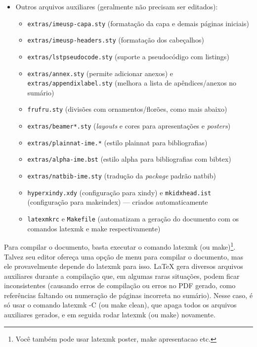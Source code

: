 \begin{itemize}
  \item Outros arquivos auxiliares (geralmente não precisam ser editados):
  \begin{itemize}
    \item \texttt{extras/imeusp-capa.sty} (formatação da capa e demais páginas iniciais)
    \item \texttt{extras/imeusp-headers.sty} (formatação dos cabeçalhos)
    \item \texttt{extras/lstpseudocode.sty} (suporte a pseudocódigo com \textsf{listings})
    \item \texttt{extras/annex.sty} (permite adicionar anexos) e
          \texttt{extras/appendixlabel.sty} (melhora a lista de
          apêndices/anexos no sumário)
    \item \texttt{frufru.sty} (divisões com ornamentos/florões, como mais abaixo)
    \item \texttt{extras/beamer*.sty} (\textit{layouts} e cores para
          apresentações e \textit{posters})
    \item \texttt{extras/plainnat-ime.*} (estilo plainnat para bibliografias)
    \item \texttt{extras/alpha-ime.bst} (estilo alpha para bibliografias com
          bibtex)
    \item \texttt{extras/natbib-ime.sty} (tradução da \textit{package}
          padrão natbib)
    \item \texttt{hyperxindy.xdy} (configuração para xindy) e
          \texttt{mkidxhead.ist} (configuração para makeindex) --- criados automaticamente
    \item \texttt{latexmkrc} e \texttt{Makefile} (automatizam a geração do
          documento com os comandos \textsf{latexmk} e \textsf{make} respectivamente)
  \end{itemize}
\end{itemize}

\frufru

Para compilar o documento, basta executar o comando \textsf{latexmk} (ou
\textsf{make})\footnote{Você também pode usar \textsf{latexmk poster},
\textsf{make apresentacao} etc.}. Talvez seu editor ofereça uma
opção de menu para compilar o documento, mas ele provavelmente depende do
\textsf{latexmk} para isso. \LaTeX{} gera diversos arquivos auxiliares
durante a compilação que, em algumas raras situações, podem ficar
inconsistentes (causando erros de compilação ou erros no PDF gerado, como
referências faltando ou numeração de páginas incorreta no sumário). Nesse
caso, é só usar o comando \textsf{latexmk -C} (ou \textsf{make clean}),
que apaga todos os arquivos auxiliares gerados, e em seguida rodar
\textsf{latexmk} (ou \textsf{make}) novamente.


